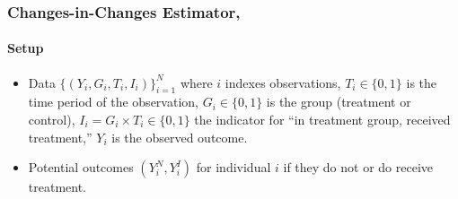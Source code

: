 \documentclass[12pt]{article}
\theoremstyle{plain}
\theoremstyle{definition}
\theoremstyle{remark}
\begin{document}
\subsubsection{Changes-in-Changes Estimator,
\cite{athey2006identification}}

\paragraph{Setup}
\begin{itemize}
  \item
    Data $\{(Y_i,G_i,T_i,I_i)\}_{i=1}^N$ where $i$
    indexes observations, $T_i\in\{0,1\}$ is the time period of the
    observation, $G_i\in\{0,1\}$ is the group (treatment or
    control), $I_i=G_i\times T_i\in\{0,1\}$ the indicator for ``in
    treatment group, received treatment,'' $Y_i$ is the
    observed outcome.
  \item Potential outcomes $(Y_i^N,Y_i^I)$ for individual $i$ if
    they do not or do receive treatment.
\end{itemize}
\end{document}
